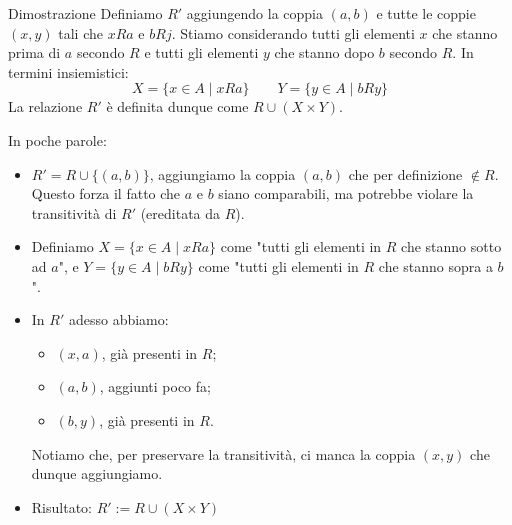 \documentclass[12pt]{report}
\begin{document}
	\begin{dimostrazione}{Dimostrazione}{}
		Definiamo $R'$ aggiungendo la coppia $(a, b)$ e tutte le coppie $(x, y)$ tali che $xRa$ e $bRj$.
		Stiamo considerando tutti gli elementi $x$ che stanno prima di $a$ secondo $R$ e tutti gli elementi $y$ che stanno dopo $b$ secondo $R$. In termini insiemistici:
		\[
		X = \{x \in A \mid xRa\} \qquad Y = \{y \in A \mid bRy\}
		\]
		La relazione $R'$ è definita dunque come $R \cup (X \times Y)$.
	\end{dimostrazione}
	
	\newpage
	In poche parole:
	\begin{itemize}
		\item $R' = R \cup \{(a, b)\}$, aggiungiamo la coppia $(a, b)$ che per definizione $\notin R$. Questo forza il fatto che $a$ e $b$ siano comparabili, ma potrebbe violare la transitività di $R'$ (ereditata da $R$).
		\item Definiamo $X = \{x \in A \mid xRa\}$ come "tutti gli elementi in $R$ che stanno sotto ad $a$", e $Y = \{y \in A \mid bRy\}$ come "tutti gli elementi in $R$ che stanno sopra a $b$".
		\item In $R'$ adesso abbiamo:
		\begin{itemize}
			\item $(x, a)$, già presenti in $R$;
			\item $(a, b)$, aggiunti poco fa;
			\item $(b, y)$, già presenti in $R$.
		\end{itemize}
		Notiamo che, per preservare la transitività, ci manca la coppia $(x, y)$ che dunque aggiungiamo.
		\item Risultato: $R' := R \cup (X \times Y)$
	\end{itemize}
	
\end{document}
